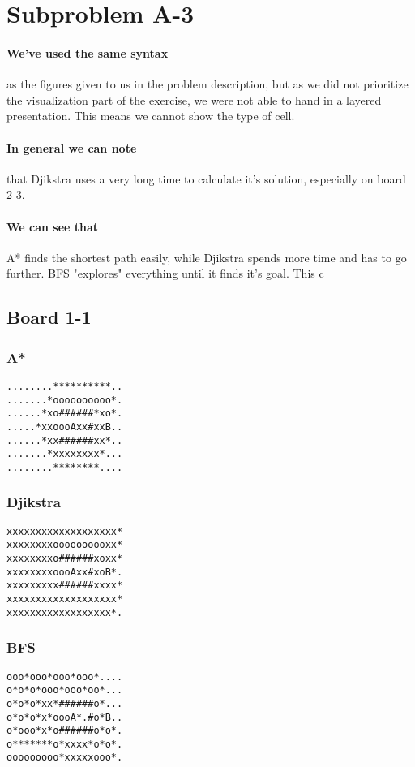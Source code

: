 \documentclass[11pt,a4paper]{article}
\begin{document}
\section*{Subproblem A-3}
\paragraph{We've used the same syntax} as the figures given to us in the problem description, but as we did not prioritize the visualization part of the exercise, we were not able to hand in a layered presentation. This means we cannot show the type of cell.

\paragraph{In general we can note} that Djikstra uses a very long time to calculate it's solution, especially on board 2-3.\paragraph{We can see that} A* finds the shortest path easily, while Djikstra spends more time and has to go further. BFS "explores" everything until it finds it's goal. This c

\subsection*{Board 1-1}
\subsubsection*{A*}
\begin{lstlisting}
........**********..
.......*oooooooooo*.
......*xo######*xo*.
.....*xxoooAxx#xxB..
......*xx######xx*..
.......*xxxxxxxx*...
........********....
\end{lstlisting}

\subsubsection*{Djikstra}
\begin{lstlisting}
xxxxxxxxxxxxxxxxxxx*
xxxxxxxxoooooooooxx*
xxxxxxxxo######xoxx*
xxxxxxxxoooAxx#xoB*.
xxxxxxxxx######xxxx*
xxxxxxxxxxxxxxxxxxx*
xxxxxxxxxxxxxxxxxx*.
\end{lstlisting}

\subsubsection*{BFS}
\begin{lstlisting}
ooo*ooo*ooo*ooo*....
o*o*o*ooo*ooo*oo*...
o*o*o*xx*######o*...
o*o*o*x*oooA*.#o*B..
o*ooo*x*o######o*o*.
o*******o*xxxx*o*o*.
ooooooooo*xxxxxooo*.
\end{lstlisting}
\end{document}

